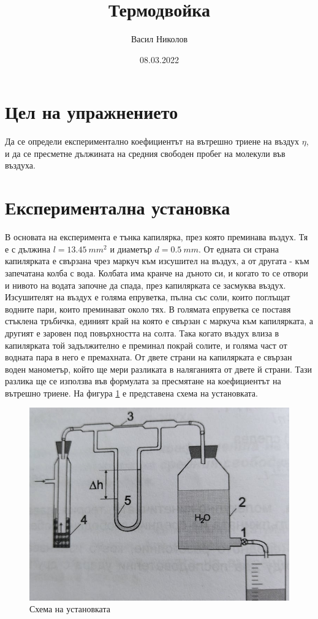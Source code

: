 \documentclass[%
 reprint,
 amsmath,amssymb,
 aps,
]{revtex4-2}
\begin{document}
\setlength{\abovedisplayskip}{3pt}
\setlength{\belowdisplayskip}{3pt}    

\title{Термодвойка}
\author{Васил Николов}
\date{08.03.2022}
\maketitle

\section{Цел на упражнението}

Да се определи експериментално коефициентът на вътрешно триене на въздух $\eta$, и да се пресметне дължината на средния свободен пробег на молекули във въздуха. 

\section{Експериментална установка}

В основата на експеримента е тънка капилярка, през която преминава въздух. Тя е с дължина $l=13.45 \ \si{mm^2}$ и диаметър $d = 0.5 \ \si{mm}$. От едната си страна капилярката е свързана чрез маркуч към изсушител на въздух, а от другата - към запечатана колба с вода. Колбата има кранче на дъното си, и когато то се отвори и нивото на водата започне да спада, през капилярката се засмуква въздух. Изсушителят на въздух е голяма епруветка, пълна със соли, които поглъщат водните пари, които преминават около тях. В голямата епруветка се поставя стъклена тръбичка, единият край на която е свързан с маркуча към капилярката, а другият е заровен под повърхността на солта. Така когато въздух влиза в капилярката той задължително е преминал покрай солите, и голяма част от водната пара в него е премахната. От двете страни на капилярката е свързан воден манометър, който ще мери разликата в наляганията от двете й страни. Тази разлика ще се използва във формулата за пресмятане на коефициентът на вътрешно триене. На фигура \ref{fig:1} е представена схема на установката. 

\begin{figure}[H] 
    \centering
    \includegraphics[width=0.9\columnwidth, keepaspectratio=true]{scheme_1.jpg}
    \caption{Схема на установката}\label{fig:1} 
\end{figure}
\end{document}
